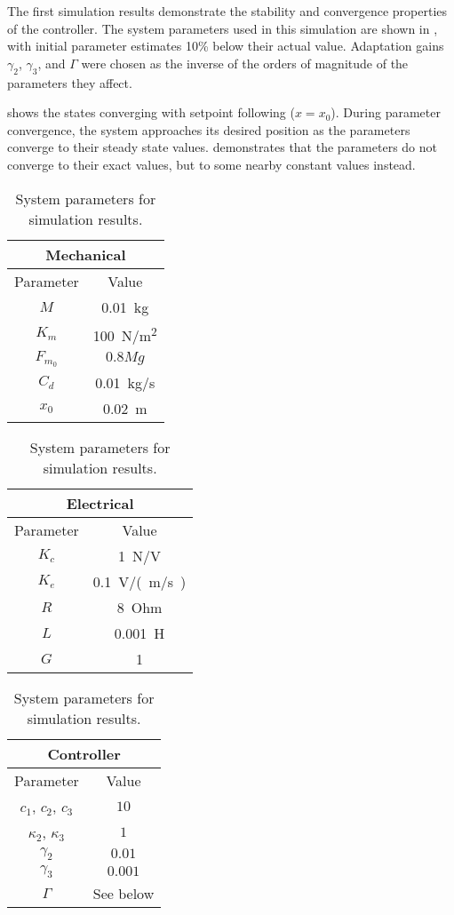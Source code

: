 The first simulation results demonstrate the stability and convergence
properties of the controller. The system parameters used in this
simulation are shown in , with initial parameter
estimates 10\% below their actual value.  Adaptation gains $\gamma_2$,
$\gamma_3$, and $\Gamma$ were chosen as the inverse of the orders of
magnitude of the parameters they affect.

 shows the states converging with setpoint
following ($x=x_0$). During parameter convergence, the system
approaches its desired position as the parameters converge to their
steady state values.  demonstrates that the
parameters do not converge to their exact values, but to some nearby
constant values instead.

\begin{table}
\centering
\caption{System parameters for simulation results.}
\vspace{-\baselineskip}%
\null\hfill
\begin{tabular}{@{}|cc|@{}}
\hline
\multicolumn{2}{|c|}{Mechanical} \\
\hline
Parameter & Value \\
\hline
$M$ & \SI{0.01}{kg} \\
$K_m$ & \SI{100}{N/m^2} \\
$F_{m_0}$ & $0.8 Mg$ \\
$C_d$ & \SI{0.01}{kg/s} \\
$x_0$ & \SI{0.02}{m} \\
\hline
\end{tabular}\hfill
\begin{tabular}{@{}|cc|@{}}
\hline
\multicolumn{2}{|c|}{Electrical} \\
\hline
Parameter & Value \\
\hline
$K_c$ & \SI{1}{N/V} \\
$K_e$ & \SI{0.1}{V/(m/s)} \\
$R$ & \SI{8}{Ohm} \\
$L$ & \SI{0.001}{H} \\
$G$ & 1 \\
\hline
\end{tabular}\hfill
\begin{tabular}{@{}|cc|@{}}
\hline
\multicolumn{2}{|c|}{Controller} \\
\hline
Parameter & Value \\
\hline
$c_1$, $c_2$, $c_3$ & $10$ \\
$\kappa_2$, $\kappa_3$ & $1$ \\
$\gamma_2$ & $0.01$ \\
$\gamma_3$ & $0.001$ \\
$\Gamma$ & See below \\
\hline
\end{tabular}
\hfill\null
\bigskip

\end{table}

